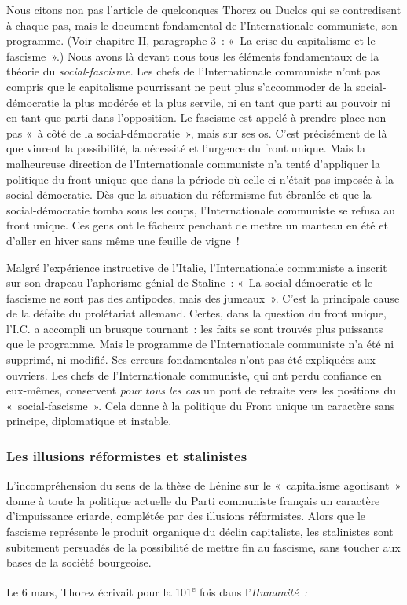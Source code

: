 \documentclass[french,twoside]{book} %
\begin{document}
Nous citons non pas l’article de quelconques Thorez ou Duclos qui se contredisent à chaque pas, mais le document fondamental de l’Internationale communiste, son programme. (Voir chapitre II, paragraphe 3 : « La crise du capitalisme et le fascisme ».) Nous avons là devant nous tous les éléments fondamentaux de la théorie du \emph{social-fascisme.} Les chefs de l’Internationale communiste n’ont pas compris que le capitalisme pourrissant ne peut plus s’accommoder de la social-démocratie la plus modérée et la plus servile, ni en tant que parti au pouvoir ni en tant que parti dans l’opposition. Le fascisme est appelé à prendre place non pas « à côté de la social-démocratie », mais sur ses os. C’est précisément de là que vinrent la possibilité, la nécessité et l’urgence du front unique. Mais la malheureuse direction de l’Internationale communiste n’a tenté d’appliquer la politique du front unique que dans la période où celle-ci n’était pas imposée à la social-démocratie. Dès que la situation du  réformisme fut ébranlée et que la social-démocratie tomba sous les coups, l’Internationale communiste se refusa au front unique. Ces gens ont le fâcheux penchant de mettre un manteau en été et d’aller en hiver sans même une feuille de vigne !\par
Malgré l’expérience instructive de l’Italie, l’Internationale communiste a inscrit sur son drapeau l’aphorisme génial de Staline : « La social-démocratie et le fascisme ne sont pas des antipodes, mais des jumeaux ». C’est la principale cause de la défaite du prolétariat allemand. Certes, dans la question du front unique, l’I.C. a accompli un brusque tournant : les faits se sont trouvés plus puissants que le programme. Mais le programme de l’Internationale communiste n’a été ni supprimé, ni modifié. Ses erreurs fondamentales n’ont pas été expliquées aux ouvriers. Les chefs de l’Internationale communiste, qui ont perdu confiance en eux-mêmes, conservent \emph{pour tous les cas} un pont de retraite vers les positions du « social-fascisme ». Cela donne à la politique du Front unique un caractère sans principe, diplomatique et instable.
\subsubsection[{Les illusions réformistes et stalinistes}]{Les illusions réformistes et stalinistes}
\noindent L’incompréhension du sens de la thèse de Lénine sur le « capitalisme agonisant » donne à toute la politique actuelle du Parti communiste français un caractère d’impuissance criarde, complétée par des illusions réformistes. Alors que le fascisme représente le produit organique du déclin capitaliste, les stalinistes sont subitement persuadés de la possibilité de mettre fin au fascisme, sans toucher aux bases de la société bourgeoise.\par
Le 6 mars, Thorez écrivait pour la 101\textsuperscript{e} fois dans l’\emph{Humanité :}\par
\end{document}
